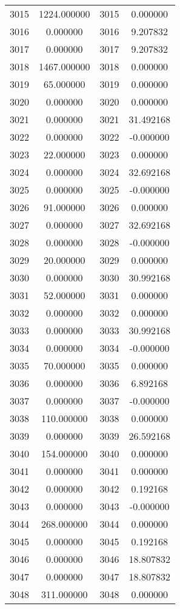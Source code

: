 \documentclass[12pt]{article}
\begin{document}
\begin{longtable}{@{}cccc@{}}
3015 & 1224.000000 & 3015 & 0.000000 \\
3016 & 0.000000 & 3016 & 9.207832 \\
3017 & 0.000000 & 3017 & 9.207832 \\
3018 & 1467.000000 & 3018 & 0.000000 \\
3019 & 65.000000 & 3019 & 0.000000 \\
3020 & 0.000000 & 3020 & 0.000000 \\
3021 & 0.000000 & 3021 & 31.492168 \\
3022 & 0.000000 & 3022 & -0.000000 \\
3023 & 22.000000 & 3023 & 0.000000 \\
3024 & 0.000000 & 3024 & 32.692168 \\
3025 & 0.000000 & 3025 & -0.000000 \\
3026 & 91.000000 & 3026 & 0.000000 \\
3027 & 0.000000 & 3027 & 32.692168 \\
3028 & 0.000000 & 3028 & -0.000000 \\
3029 & 20.000000 & 3029 & 0.000000 \\
3030 & 0.000000 & 3030 & 30.992168 \\
3031 & 52.000000 & 3031 & 0.000000 \\
3032 & 0.000000 & 3032 & 0.000000 \\
3033 & 0.000000 & 3033 & 30.992168 \\
3034 & 0.000000 & 3034 & -0.000000 \\
3035 & 70.000000 & 3035 & 0.000000 \\
3036 & 0.000000 & 3036 & 6.892168 \\
3037 & 0.000000 & 3037 & -0.000000 \\
3038 & 110.000000 & 3038 & 0.000000 \\
3039 & 0.000000 & 3039 & 26.592168 \\
3040 & 154.000000 & 3040 & 0.000000 \\
3041 & 0.000000 & 3041 & 0.000000 \\
3042 & 0.000000 & 3042 & 0.192168 \\
3043 & 0.000000 & 3043 & -0.000000 \\
3044 & 268.000000 & 3044 & 0.000000 \\
3045 & 0.000000 & 3045 & 0.192168 \\
3046 & 0.000000 & 3046 & 18.807832 \\
3047 & 0.000000 & 3047 & 18.807832 \\
3048 & 311.000000 & 3048 & 0.000000 \\

\end{longtable}
\end{document}

